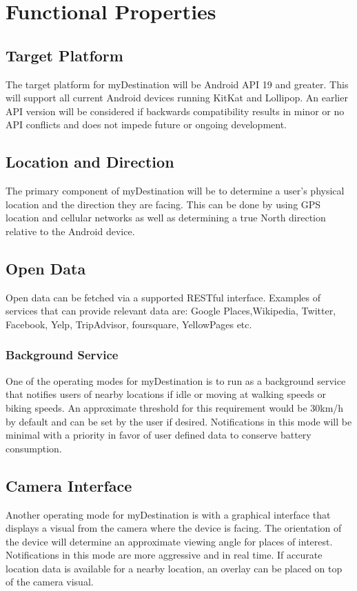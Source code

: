 \documentclass{article}
\begin{document}
\section{Functional Properties}
\subsection{Target Platform}
The target platform for myDestination will be Android API 19 and greater.  This will support all current Android devices running KitKat and Lollipop.  An earlier API version will be considered if backwards compatibility results in minor or no API conflicts and does not impede future or ongoing development.
\subsection{Location and Direction}
The primary component of myDestination will be to determine a user’s physical location and the direction they are facing.  This can be done by using GPS location and cellular networks as well as determining a true North direction relative to the Android device.
\subsection{Open Data}
Open data can be fetched via a supported RESTful interface.  Examples of services that can provide relevant data are: Google Places,Wikipedia, Twitter, Facebook, Yelp, TripAdvisor, foursquare, YellowPages etc.
\subsubsection{Background Service}
One of the operating modes for myDestination is to run as a background service that notifies users of nearby locations if idle or moving at walking speeds or biking speeds.  An approximate threshold for this requirement would be 30km/h by default and can be set by the user if desired.  Notifications in this mode will be minimal with a priority in favor of user defined data to conserve battery consumption.
\subsection{Camera Interface}
Another operating mode for myDestination is with a graphical interface that displays a visual from the camera where the device is facing.  The orientation of the device will determine an approximate viewing angle for places of interest.  Notifications in this mode are more aggressive and in real time.  If accurate location data is available for a nearby location, an overlay can be placed on top of the camera visual.
\end{document}
